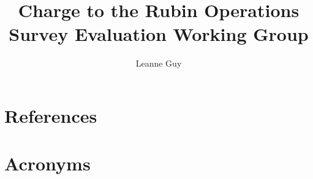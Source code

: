 \documentclass[DM,authoryear,toc]{lsstdoc}
\title{Charge to the Rubin Operations Survey Evaluation Working Group}
\author{%
Leanne Guy
}
\date{\vcsDate}
\begin{document}
\maketitle


\appendix
\section{References} \label{sec:bib}
\renewcommand{\refname}{} %


\section{Acronyms} \label{sec:acronyms}

\end{document}

